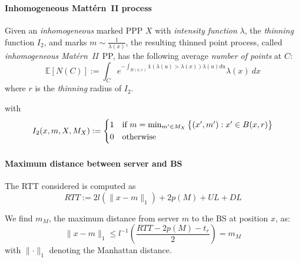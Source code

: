 \documentclass[aspectratio=169]{beamer}
\begin{document}
\begin{frame}
    \frametitle{\secname}
    \framesubtitle{Inhomogeneous Mattérn~II process}
    \begin{lemma}
    Given an \emph{inhomogeneous} marked PPP $X$ with \emph{intensity function} $\lambda$, the \emph{thinning} function $I_2$, and marks $m \sim \frac{1}{\lambda(x)}$, the resulting thinned point process, called \emph{inhomogeneous Mat\'ern~II}~PP, has the following average \emph{number of points} at $C$:
        \begin{equation}
            \mathbb{E}\left[ N(C) \right] := \int_C e^{-\int_{B(x,r)} \mathds{1}\left(\lambda(u) > \lambda(x) \right) \lambda(u) du} \lambda(x)\ dx
            \label{eq:inh-matern2-avg}
        \end{equation}
        where $r$ is the \emph{thinning} radius of $I_2$.
        \label{prop:inh-matern2-avg}
    \end{lemma}



    \vfill
    with
    \begin{equation}
        I_2(x,m, X, M_X) := \begin{cases*}
            1 & if $m = \min_{m' \in M_X}\big\{ (x',m'): x'\in B(x,r) \big\}$\\
            0 & otherwise
        \end{cases*}
        \label{eq:matern2}
    \end{equation}

\end{frame}





\begin{frame}
    \frametitle{\secname}
    \framesubtitle{Maximum distance between server and BS}


    The RTT considered is computed as
    \begin{equation}
        RTT := 2 l\left(\lVert x - m \rVert_1 \right) + 2 p(M) + UL + DL
        \label{eq:rtt}
    \end{equation}


    We find $m_M$, the maximum distance from server $m$ to the BS at position $x$, as:
    \begin{equation}
        \lVert x-m \rVert_1 \le l^{-1}\left( \frac{RTT - 2p(M) - t_r}{2} \right)  = m_M
        \label{eq:max-dis}
    \end{equation}
    with $\lVert \cdot \rVert_1$ denoting the Manhattan distance.
\end{frame}
\end{document}

